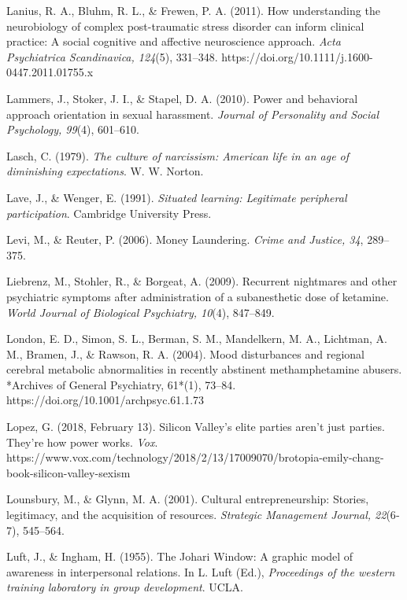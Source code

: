 \begin{thebibliography}{}
    Lanius, R. A., Bluhm, R. L., \& Frewen, P. A. (2011). How understanding the neurobiology of complex post-traumatic stress disorder can inform clinical practice: A social cognitive and affective neuroscience approach. \textit{Acta Psychiatrica Scandinavica, 124}(5), 331–348. https://doi.org/10.1111/j.1600-0447.2011.01755.x

    Lammers, J., Stoker, J. I., \& Stapel, D. A. (2010). Power and behavioral approach orientation in sexual harassment. \textit{Journal of Personality and Social Psychology, 99}(4), 601–610.

    Lasch, C. (1979). \textit{The culture of narcissism: American life in an age of diminishing expectations}. W. W. Norton.
    
    Lave, J., \& Wenger, E. (1991). \textit{Situated learning: Legitimate peripheral participation}. Cambridge University Press.

    Levi, M., \& Reuter, P. (2006). Money Laundering. \textit{Crime and Justice, 34}, 289–375.

    Liebrenz, M., Stohler, R., \& Borgeat, A. (2009). Recurrent nightmares and other psychiatric symptoms after administration of a subanesthetic dose of ketamine. \textit{World Journal of Biological Psychiatry, 10}(4), 847–849.

    London, E. D., Simon, S. L., Berman, S. M., Mandelkern, M. A., Lichtman, A. M., Bramen, J., \& Rawson, R. A. (2004). Mood disturbances and regional cerebral metabolic abnormalities in recently abstinent methamphetamine abusers. *Archives of General Psychiatry, 61*(1), 73–84. https://doi.org/10.1001/archpsyc.61.1.73

    Lopez, G. (2018, February 13). Silicon Valley’s elite parties aren’t just parties. They’re how power works. \textit{Vox}. https://www.vox.com/technology/2018/2/13/17009070/brotopia-emily-chang-book-silicon-valley-sexism

    Lounsbury, M., \& Glynn, M. A. (2001). Cultural entrepreneurship: Stories, legitimacy, and the acquisition of resources. \textit{Strategic Management Journal, 22}(6‐7), 545–564.

    Luft, J., \& Ingham, H. (1955). The Johari Window: A graphic model of awareness in interpersonal relations. In L. Luft (Ed.), \textit{Proceedings of the western training laboratory in group development}. UCLA.


\end{thebibliography}
